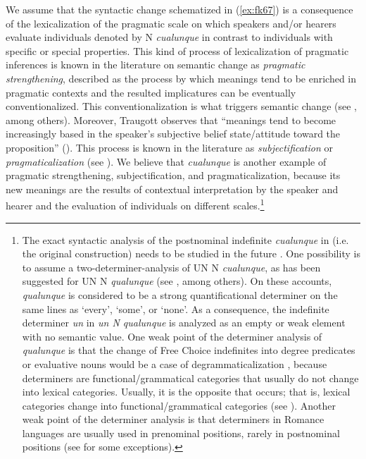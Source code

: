 \documentclass[output=paper,colorlinks,citecolor=brown]{langscibook}
\begin{document}
We assume that the syntactic change schematized in (\ref{ex:fk67}) is a consequence of the lexicalization of the pragmatic scale on which speakers and/or hearers evaluate individuals denoted by N \textit{cualunque} in contrast to individuals with specific or special properties. This kind of process of lexicalization of pragmatic inferences is known in the literature on semantic change as \textit{pragmatic strengthening}, described as the process by which meanings tend to be enriched in pragmatic contexts and the resulted implicatures can be eventually conventionalized. This conventionalization is what triggers semantic change (see \citealt[][35]{Traugott1989}, among others). Moreover, Traugott observes that “meanings tend to become increasingly based in the speaker’s subjective belief state/attitude toward the proposition” (\cite[][35]{Traugott1989}). This process is known in the literature as \textit{subjectification} or \textit{pragmaticalization} (see \citep{Diewald2011}). We believe that \textit{cualunque} is another example of pragmatic strengthening, subjectification, and pragmaticalization, because its new meanings are the results of contextual interpretation by the speaker and hearer and the evaluation of individuals on different scales.\footnote{The exact syntactic analysis of the postnominal indefinite \textit{cualunque} in  (i.e. the original construction) needs to be studied in the future \citep[see][]{Kellert2021c}. One possibility is to assume a two-determiner-analysis of UN N \textit{cualunque}, as has been suggested for UN N \textit{qualunque} (see \cite{Zamparelli2000}, among others). On these accounts, \textit{qualunque} is considered to be a strong quantificational determiner on the same lines as ‘every’, ‘some’, or ‘none’. As a consequence, the indefinite determiner \textit{un} in \textit{un N qualunque} is analyzed as an empty or weak element with no semantic value. One weak point of the determiner analysis of \textit{qualunque} is that the change of Free Choice indefinites into degree predicates or evaluative nouns would be a case of degrammaticalization \citep[see][]{Kellert2021c}, because determiners are functional/grammatical categories that usually do not change into lexical categories. Usually, it is the opposite that occurs; that is, lexical categories change into functional/grammatical categories (see \cite{RobertsRoussou2003}). Another weak point of the determiner analysis is that determiners in Romance languages are usually used in prenominal positions, rarely in postnominal positions (see \cite{Stark2006} for some exceptions).}
\end{document}
